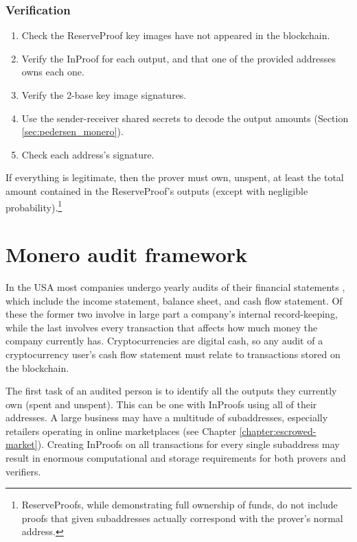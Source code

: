 \subsubsection*{Verification}

\begin{enumerate}
    \item Check the ReserveProof key images have not appeared in the blockchain.
    \item Verify the InProof for each output, and that one of the provided addresses owns each one.
    \item Verify the 2-base key image signatures.
    \item Use the sender-receiver shared secrets to decode the output amounts (Section \ref{sec:pedersen_monero}).
    \item Check each address's signature.
\end{enumerate}{}

If everything is legitimate, then the prover must own, unspent, at least the total amount contained in the ReserveProof's outputs (except with negligible probability).\footnote{ReserveProofs, while demonstrating full ownership of funds, do not include proofs that given subaddresses actually correspond with the prover's normal address.}



\section{Monero audit framework}
\label{sec:proofs-monero-audit-framework}

In the USA most companies undergo yearly audits of their financial statements \cite{investopedia-audits}, which include the income statement, balance sheet, and cash flow statement. Of these the former two involve in large part a company's internal record-keeping, while the last involves every transaction that affects how much money the company currently has. Cryptocurrencies are digital cash, so any audit of a cryptocurrency user's cash flow statement must relate to transactions stored on the blockchain.

The first task of an audited person is to identify all the outputs they currently own (spent and unspent). This can be one with InProofs using all of their addresses. A large business may have a multitude of subaddresses, especially retailers operating in online marketplaces (see Chapter 
\ref{chapter:escrowed-market}). Creating InProofs on all transactions for every single subaddress may result in enormous computational and storage requirements for both provers and verifiers.

